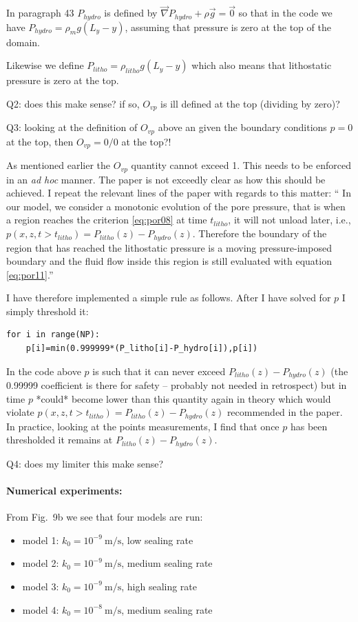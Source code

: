 In paragraph 43 $P_{hydro}$ is defined by $\vec\nabla P_{hydro} + \rho \vec{g} = \vec{0}$ 
so that in the code we have $P_{hydro}=\rho_m g (L_y -y)$, 
assuming that pressure is zero at the top of the domain. 

Likewise we define $P_{litho}=\rho_{litho} g (L_y -y)$ which 
also means that lithostatic pressure is zero at the top. 

{\color{red} Q2: does this make sense? if so, $O_{vp}$ is ill defined at the top (dividing by zero)?}

{\color{red} Q3: looking at the definition of $O_{vp}$ above an given the boundary conditions $p=0$
at the top, then $O_{vp}=0/0$ at the top?!}

As mentioned earlier the $O_{vp}$ quantity cannot exceed 1. This needs to be 
enforced in an {\it ad hoc} manner. The paper is not exceedly clear as how 
this should be achieved. I repeat the relevant lines of the paper with regards 
to this matter:
``
In our model, we consider a monotonic evolution of the pore pressure, that
is when a region reaches the criterion \eqref{eq:por08} at time $t_{litho}$, it
will not unload later, i.e., $p(x,z,t > t_{litho}) = P_{litho}(z)-P_{hydro}(z)$.
Therefore the boundary of the region that has reached the
lithostatic pressure is a moving pressure-imposed boundary
and the fluid flow inside this region is still evaluated with
equation \eqref{eq:por11}.''

I have therefore implemented a simple rule as follows. After I have solved for $p$
I simply threshold it:
\begin{lstlisting}
for i in range(NP):
    p[i]=min(0.999999*(P_litho[i]-P_hydro[i]),p[i])
\end{lstlisting}
In the code above $p$ is such that it can never exceed $P_{litho}(z)-P_{hydro}(z)$ 
(the 0.99999 coefficient is there for safety -- probably not needed in retrospect) but 
in time $p$ *could* become lower than this quantity again in theory which would violate
$p(x,z,t > t_{litho}) = P_{litho}(z)-P_{hydro}(z)$ recommended in the paper. 
In practice, looking at the points measurements, 
I find that once $p$ has been thresholded it remains at $P_{litho}(z)-P_{hydro}(z)$.

{\color{red} Q4: does my limiter this make sense?}

\paragraph{Numerical experiments:} From Fig.~9b we see that four models are run:
\begin{itemize}
\item model 1: $k_0=10^{-9}~\si{\meter\per\second}$, low sealing rate
\item model 2: $k_0=10^{-9}~\si{\meter\per\second}$, medium sealing rate
\item model 3: $k_0=10^{-9}~\si{\meter\per\second}$, high sealing rate
\item model 4: $k_0=10^{-8}~\si{\meter\per\second}$, medium sealing rate
\end{itemize}

